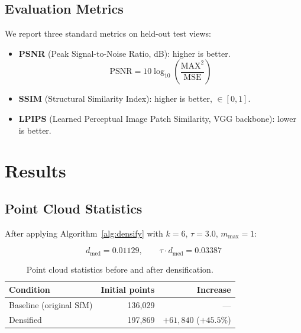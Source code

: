 \documentclass[12pt, a4paper]{article}
\begin{document}
\subsection{Evaluation Metrics}

We report three standard metrics on held-out test views:

\begin{itemize}
    \item \textbf{PSNR} (Peak Signal-to-Noise Ratio, dB): higher is better.
    \begin{equation}
        \text{PSNR} = 10\log_{10}\!\left(\frac{\text{MAX}^2}{\text{MSE}}\right)
    \end{equation}
    \item \textbf{SSIM} (Structural Similarity Index): higher is better, $\in [0,1]$.
    \item \textbf{LPIPS} (Learned Perceptual Image Patch Similarity,
    VGG backbone): lower is better.
\end{itemize}

\section{Results}

\subsection{Point Cloud Statistics}

After applying Algorithm~\ref{alg:densify} with $k=6$, $\tau=3.0$, $m_\text{max}=1$:

\begin{equation}
    d_\text{med} = 0.01129, \qquad \tau \cdot d_\text{med} = 0.03387
\end{equation}

\begin{table}[h]
\centering
\caption{Point cloud statistics before and after densification.}
\label{tab:pointcloud}
\begin{tabular}{lrr}
\toprule
\textbf{Condition} & \textbf{Initial points} & \textbf{Increase} \\
\midrule
Baseline (original SfM) & 136{,}029 & --- \\
Densified               & 197{,}869 & $+61{,}840$ ($+45.5\%$) \\
\bottomrule
\end{tabular}
\end{table}
\end{document}
